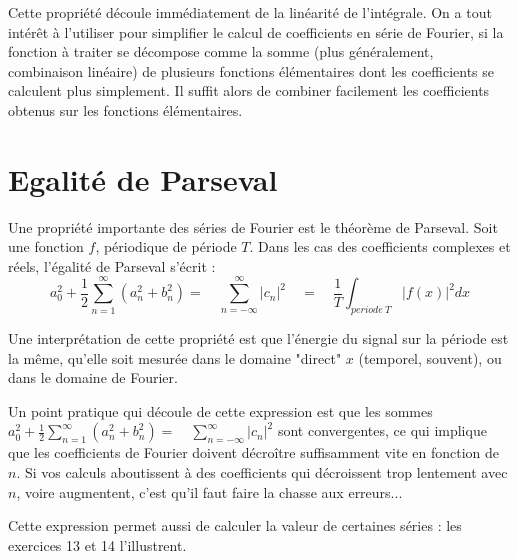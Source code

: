 Cette propriété découle immédiatement de la linéarité de l'intégrale. On a tout intérêt à l'utiliser pour simplifier le calcul de coefficients en série de Fourier,  si la fonction à traiter se décompose comme la somme (plus généralement, combinaison linéaire) de plusieurs fonctions élémentaires dont les coefficients se calculent plus simplement. Il suffit alors de combiner facilement les coefficients obtenus sur les fonctions élémentaires.

\section{Egalité de Parseval}

Une propriété importante des séries de Fourier est le théorème de
Parseval. Soit une fonction $f$, périodique de période $T$. Dans les cas des coefficients complexes et réels, l'égalité de Parseval s'écrit :
\begin{equation}
a_0^2+\frac{1}{2}\sum_{n=1}^\infty (a_n^2+b_n^2)=\quad \sum_{n=-\infty}^\infty | c_n|^2 \quad=\quad \frac{1}{T}\int_{periode~T}|f(x)|^2 dx
\end{equation}

Une interprétation de cette propriété est que l'énergie du signal sur la période est la même, qu'elle soit mesurée dans le domaine "direct" $x$ (temporel, souvent), ou dans le domaine de Fourier. 

Un point pratique qui découle de cette expression est que les sommes $a_0^2 + \frac{1}{2}\sum_{n=1}^\infty (a_n^2+b_n^2)=\quad\sum_{n=-\infty}^\infty | c_n|^2 $ sont convergentes, ce qui implique que les coefficients de Fourier doivent décroître suffisamment vite en fonction de $n$. Si vos calculs aboutissent à des coefficients qui décroissent trop lentement avec $n$, voire augmentent, c'est qu'il faut faire la chasse aux erreurs...

Cette expression permet aussi de calculer la valeur de certaines séries : les exercices 13 et 14 l'illustrent.




